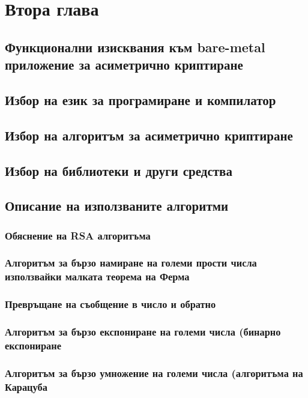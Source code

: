 \chapter{Втора глава} %
\section{Функционални изисквания към bare-metal приложение за асиметрично криптиране}
\section{Избор на език за програмиране и компилатор}
\section{Избор на алгоритъм за асиметрично криптиране}
\section{Избор на библиотеки и други средства}
\section{Описание на използваните алгоритми}
  \subsection{Обяснение на RSA алгоритъма}
  \subsection{Алгоритъм за бързо намиране на големи прости числа използвайки малката теорема на Ферма}
  \subsection{Превръщане на съобщение в число и обратно}
  \subsection{Алгоритъм за бързо експониране на големи числа (бинарно експониране}
  \subsection{Алгоритъм за бързо умножение на големи числа (алгоритъма на Карацуба}

